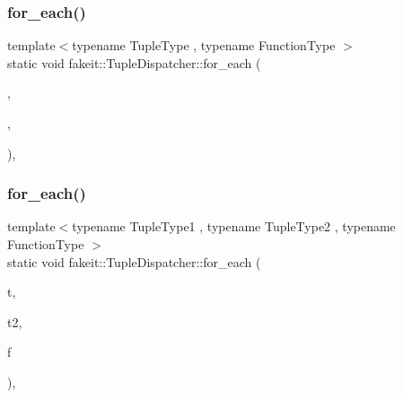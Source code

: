 \mbox{\label{structfakeit_1_1TupleDispatcher_af22c1fae8c695f722da986df9af411ca}} 
\subsubsection{\texorpdfstring{for\_each()}{for\_each()}\hspace{0.1cm}{\footnotesize\ttfamily [42/54]}}
{\footnotesize\ttfamily template$<$typename Tuple\+Type , typename Function\+Type $>$ \\
static void fakeit\+::\+Tuple\+Dispatcher\+::for\+\_\+each (\begin{DoxyParamCaption}\item[{Tuple\+Type \&\&}]{,  }\item[{Function\+Type \&}]{,  }\item[{std\+::integral\+\_\+constant$<$ size\+\_\+t, std\+::tuple\+\_\+size$<$ typename std\+::remove\+\_\+reference$<$ Tuple\+Type $>$\+::type $>$\+::value $>$}]{ }\end{DoxyParamCaption})\hspace{0.3cm}{\ttfamily [inline]}, {\ttfamily [static]}}

\mbox{\label{structfakeit_1_1TupleDispatcher_a1ddb90f24aa73dd61bf2b95c5f176cd5}} 
\subsubsection{\texorpdfstring{for\_each()}{for\_each()}\hspace{0.1cm}{\footnotesize\ttfamily [43/54]}}
{\footnotesize\ttfamily template$<$typename Tuple\+Type1 , typename Tuple\+Type2 , typename Function\+Type $>$ \\
static void fakeit\+::\+Tuple\+Dispatcher\+::for\+\_\+each (\begin{DoxyParamCaption}\item[{Tuple\+Type1 \&\&}]{t,  }\item[{Tuple\+Type2 \&\&}]{t2,  }\item[{Function\+Type \&}]{f }\end{DoxyParamCaption})\hspace{0.3cm}{\ttfamily [inline]}, {\ttfamily [static]}}

